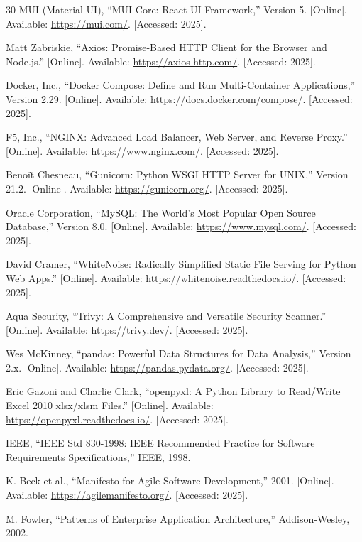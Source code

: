 \begin{thebibliography}{30}
MUI (Material UI), ``MUI Core: React UI Framework,'' Version 5. [Online]. Available: \url{https://mui.com/}. [Accessed: 2025].

Matt Zabriskie, ``Axios: Promise-Based HTTP Client for the Browser and Node.js.'' [Online]. Available: \url{https://axios-http.com/}. [Accessed: 2025].

Docker, Inc., ``Docker Compose: Define and Run Multi-Container Applications,'' Version 2.29. [Online]. Available: \url{https://docs.docker.com/compose/}. [Accessed: 2025].

F5, Inc., ``NGINX: Advanced Load Balancer, Web Server, and Reverse Proxy.'' [Online]. Available: \url{https://www.nginx.com/}. [Accessed: 2025].

Beno\"{i}t Chesneau, ``Gunicorn: Python WSGI HTTP Server for UNIX,'' Version 21.2. [Online]. Available: \url{https://gunicorn.org/}. [Accessed: 2025].

Oracle Corporation, ``MySQL: The World's Most Popular Open Source Database,'' Version 8.0. [Online]. Available: \url{https://www.mysql.com/}. [Accessed: 2025].

David Cramer, ``WhiteNoise: Radically Simplified Static File Serving for Python Web Apps.'' [Online]. Available: \url{https://whitenoise.readthedocs.io/}. [Accessed: 2025].

Aqua Security, ``Trivy: A Comprehensive and Versatile Security Scanner.'' [Online]. Available: \url{https://trivy.dev/}. [Accessed: 2025].

Wes McKinney, ``pandas: Powerful Data Structures for Data Analysis,'' Version 2.x. [Online]. Available: \url{https://pandas.pydata.org/}. [Accessed: 2025].

Eric Gazoni and Charlie Clark, ``openpyxl: A Python Library to Read/Write Excel 2010 xlsx/xlsm Files.'' [Online]. Available: \url{https://openpyxl.readthedocs.io/}. [Accessed: 2025].

IEEE, ``IEEE Std 830-1998: IEEE Recommended Practice for Software Requirements Specifications,'' IEEE, 1998.

K. Beck et al., ``Manifesto for Agile Software Development,'' 2001. [Online]. Available: \url{https://agilemanifesto.org/}. [Accessed: 2025].

M. Fowler, ``Patterns of Enterprise Application Architecture,'' Addison-Wesley, 2002.


\end{thebibliography}
